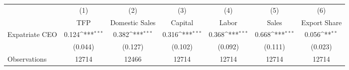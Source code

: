 {
\def\sym#1{\ifmmode^{#1}\else\(^{#1}\)\fi}
\begin{tabular}{l*{6}{c}}
\hline\hline
                    &\multicolumn{1}{c}{(1)}&\multicolumn{1}{c}{(2)}&\multicolumn{1}{c}{(3)}&\multicolumn{1}{c}{(4)}&\multicolumn{1}{c}{(5)}&\multicolumn{1}{c}{(6)}\\
                    &\multicolumn{1}{c}{TFP}&\multicolumn{1}{c}{Domestic Sales}&\multicolumn{1}{c}{Capital}&\multicolumn{1}{c}{Labor}&\multicolumn{1}{c}{Sales}&\multicolumn{1}{c}{Export Share}\\
\hline
Expatriate CEO      &       0.124\sym{***}&       0.382\sym{***}&       0.316\sym{***}&       0.368\sym{***}&       0.668\sym{***}&       0.056\sym{**} \\
                    &     (0.044)         &     (0.127)         &     (0.102)         &     (0.092)         &     (0.111)         &     (0.023)         \\
\hline
Observations        &       12714         &       12466         &       12714         &       12714         &       12714         &       12714         \\
\hline\hline
\end{tabular}
}
